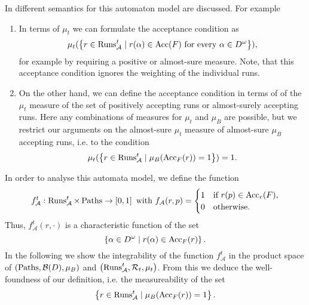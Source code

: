 In \cite{RandAutoInfTrees} different semantics for this automaton model are
discussed. For example
\begin{enumerate}
  \item In terms of $\mu_{t}$ we can formulate the acceptance condition as
    \begin{equation*}
      \mu_{t}(
        \left\{
          r\in\operatorname{Runs}_{\mathcal{A}}^{t}\mid
            r(\alpha)\in\operatorname{Acc}(F)\text{ for every }\alpha\in D^{\omega}
        \right\}
      ),
    \end{equation*}
    for example by requiring a positive or almost-sure measure. Note, that this
    acceptance condition ignores the weighting of the individual runs.
  \item On the other hand, we can define the acceptance condition in terms of
    of the $\mu_{t}$ measure of the set of positively accepting runs or
    almost-surely accepting runs. Here any combinations of measures for
    $\mu_{t}$ and $\mu_{B}$ are possible, but we restrict our arguments on the
    almost-sure $\mu_{t}$ measure of almost-sure $\mu_{B}$ accepting runs, i.e.
    to the condition
    \begin{equation*}
      \mu_{t}(
        \left\{
          r\in\operatorname{Runs}_{\mathcal{A}}^{t}\mid
            \mu_{B}(\operatorname{Acc}_{F}(r)) = 1
        \right\}
      ) = 1.
    \end{equation*}
\end{enumerate}
In order to analyse this automata model, we define the function
\begin{equation*}
  f_{\mathcal{A}}^{t}:\operatorname{Runs}_{\mathcal{A}}^{t}\times\operatorname{Paths}\rightarrow
    \left[0,1\right]
  \text{ with }
  f_{\mathcal{A}}(r, p) = \begin{cases}
    1&\text{if }r(p)\in\operatorname{Acc}_{r}(F),\\
    0&\text{otherwise.}
  \end{cases}
\end{equation*}
Thus, $f_{\mathcal{A}}^{t}(r,\cdot)$ is a characteristic function of the set
\begin{equation*}
  \left\{\alpha\in D^{\omega}\mid r(\alpha)\in\operatorname{Acc}_{F}(r)\right\}.
\end{equation*}
In the following we show the integrability of the function 
$f_{\mathcal{A}}^{t}$ in the product space of 
$\left(\operatorname{Paths}, \mathcal{B}(D), \mu_{B}\right)$ and 
$\left(\operatorname{Runs}_{\mathcal{A}}^{t}, \mathcal{R}_{t}, \mu_{t}\right)$. From this we
deduce the well-foundness of our definition, i.e. the measureability of the set
\begin{equation*}
  \left\{
    r\in\operatorname{Runs}_{\mathcal{A}}^{t}\mid
      \mu_{B}(\operatorname{Acc}_{F}(r)) = 1
  \right\}.
\end{equation*}

